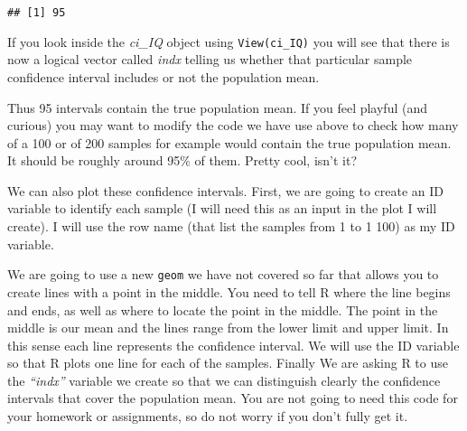 \documentclass[
]{book}
\newenvironment{Shaded}{\begin{snugshade}}{\end{snugshade}}
\newcommand{\FunctionTok}[1]{\textcolor[rgb]{0.13,0.29,0.53}{\textbf{#1}}}
\newcommand{\NormalTok}[1]{#1}
\newcommand{\OtherTok}[1]{\textcolor[rgb]{0.56,0.35,0.01}{#1}}
\newcommand{\SpecialCharTok}[1]{\textcolor[rgb]{0.81,0.36,0.00}{\textbf{#1}}}
\begin{document}
\begin{verbatim}
## [1] 95
\end{verbatim}

If you look inside the \emph{ci\_IQ} object using \texttt{View(ci\_IQ)} you will see that there is now a logical vector called \emph{indx} telling us whether that particular sample confidence interval includes or not the population mean.

Thus 95 intervals contain the true population mean. If you feel playful (and curious) you may want to modify the code we have use above to check how many of a 100 or of 200 samples for example would contain the true population mean. It should be roughly around 95\% of them. Pretty cool, isn't it?

We can also plot these confidence intervals. First, we are going to create an ID variable to identify each sample (I will need this as an input in the plot I will create). I will use the row name (that list the samples from 1 to 1 100) as my ID variable.

\begin{Shaded}
\end{Shaded}

We are going to use a new \texttt{geom} we have not covered so far that allows you to create lines with a point in the middle. You need to tell R where the line begins and ends, as well as where to locate the point in the middle. The point in the middle is our mean and the lines range from the lower limit and upper limit. In this sense each line represents the confidence interval. We will use the ID variable so that R plots one line for each of the samples. Finally We are asking R to use the \emph{``indx''} variable we create so that we can distinguish clearly the confidence intervals that cover the population mean. You are not going to need this code for your homework or assignments, so do not worry if you don't fully get it.
\end{document}
